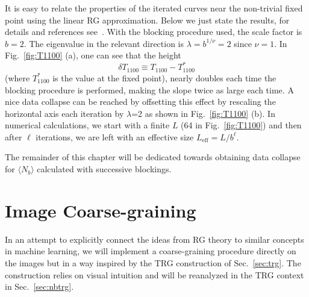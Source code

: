 \documentclass[../main.tex]{subfiles}
\begin{document}
%
It is easy to relate the properties of the iterated curves near the non-trivial
fixed point using the linear RG approximation.
%
Below we just state the results, for details and references see~\cite{prb87}.
With the blocking procedure used, the scale factor is $b=2$.
%
The eigenvalue in the relevant direction is $\lambda=b^{1/\nu}=2$ since
$\nu=1$. In Fig.~\ref{fig:T1100} (a), one can see that the height
%
\begin{equation}
    \delta T_{1100} \equiv T_{1100} - T_{1100}^{*}
\end{equation}
%
(where $T_{1100}^{*}$ is the value at the fixed point), nearly doubles each
time the blocking procedure is performed, making the slope twice as large each
time.
A nice data collapse can be reached by offsetting this effect by rescaling the
horizontal axis each iteration by $\lambda$=2 as shown in Fig.~\ref{fig:T1100}
(b).
%
In numerical calculations, we start with a finite $L$ (64 in
Fig.~\ref{fig:T1100}) and then after $\ell$ iterations, we are left with an
effective size $L_{\mathrm{eff}}=L/b^\ell$. 

The remainder of this chapter will be dedicated towards obtaining data collapse
for $\langle N_b \rangle$ calculated with successive blockings.

\section{Image Coarse-graining}%
\label{sec:rgimages}
In an attempt to explicitly connect the ideas from RG theory to similar
concepts in machine learning, we will implement a coarse-graining procedure
directly on the images but in a way inspired by the TRG construction of
Sec.~\ref{sec:trg}.
%
The construction relies on visual intuition and will be reanalyzed in the TRG
context in Sec.~\ref{sec:nbtrg}.
\end{document}
